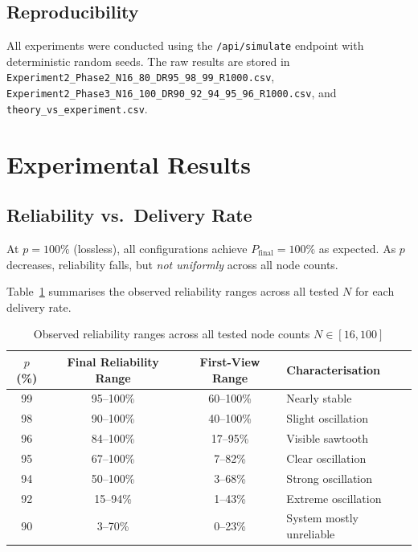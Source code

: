 \documentclass[
12pt,
oneside,
singlespacing,
parskip,
]{article}
\begin{document}
\subsection{Reproducibility}

All experiments were conducted using the \texttt{/api/simulate} endpoint with deterministic random seeds. The raw results are stored in \texttt{Experiment2\_Phase2\_N16\_80\_DR95\_98\_99\_R1000.csv}, \texttt{Experiment2\_Phase3\_N16\_100\_DR90\_92\_94\_95\_96\_R1000.csv}, and \texttt{theory\_vs\_experiment.csv}.

\section{Experimental Results}
\label{sec:results}

\subsection{Reliability vs.\ Delivery Rate}

At $p = 100\%$ (lossless), all configurations achieve $P_\mathrm{final} = 100\%$ as expected. As $p$ decreases, reliability falls, but \emph{not uniformly} across all node counts.

Table~\ref{tab:reliability_ranges} summarises the observed reliability ranges across all tested $N$ for each delivery rate.

\begin{table}[H]
\centering
\caption{Observed reliability ranges across all tested node counts $N \in [16, 100]$}
\label{tab:reliability_ranges}
\begin{tabular}{cccl}
\toprule
$p$ (\%) & Final Reliability Range & First-View Range & Characterisation \\
\midrule
99 & 95--100\% & 60--100\% & Nearly stable \\
98 & 90--100\% & 40--100\% & Slight oscillation \\
96 & 84--100\% & 17--95\% & Visible sawtooth \\
95 & 67--100\% & 7--82\% & Clear oscillation \\
94 & 50--100\% & 3--68\% & Strong oscillation \\
92 & 15--94\% & 1--43\% & Extreme oscillation \\
90 & 3--70\% & 0--23\% & System mostly unreliable \\
\bottomrule
\end{tabular}
\end{table}
\end{document}
